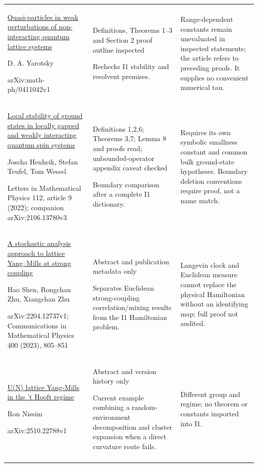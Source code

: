 \begin{longtable}{@{}p{46mm}p{60mm}p{46mm}@{}}
\href{https://arxiv.org/pdf/math-ph/0411042}{Quasi-particles in weak perturbations of non-interacting quantum lattice systems}\par D. A. Yarotsky\par arXiv:math-ph/0411042v1 & Definitions, Theorems 1--3 and Section 2 proof outline inspected\par Rechecks I1 stability and resolvent premises. & Range-dependent constants remain unevaluated in inspected statements; the article refers to preceding proofs. It supplies no convenient numerical tau.\\\addlinespace
\href{https://link.springer.com/article/10.1007/s11005-021-01494-y}{Local stability of ground states in locally gapped and weakly interacting quantum spin systems}\par Joscha Henheik, Stefan Teufel, Tom Wessel\par Letters in Mathematical Physics 112, article 9 (2022); companion arXiv:2106.13780v3 & Definitions 1,2,6; Theorems 3,7; Lemma 8 and proofs read; unbounded-operator appendix caveat checked\par Boundary comparison after a complete I1 dictionary. & Requires its own symbolic smallness constant and common bulk ground-state hypotheses. Boundary deletion conventions require proof, not a name match.\\\addlinespace
\href{https://arxiv.org/abs/2204.12737}{A stochastic analysis approach to lattice Yang--Mills at strong coupling}\par Hao Shen, Rongchan Zhu, Xiangchan Zhu\par arXiv:2204.12737v1; Communications in Mathematical Physics 400 (2023), 805--851 & Abstract and publication metadata only\par Separates Euclidean strong-coupling correlation/mixing results from the I1 Hamiltonian problem. & Langevin clock and Euclidean measure cannot replace the physical Hamiltonian without an identifying map; full proof not audited.\\\addlinespace
\href{https://arxiv.org/abs/2510.22788}{U(N) lattice Yang-Mills in the 't Hooft regime}\par Ron Nissim\par arXiv:2510.22788v1 & Abstract and version history only\par Current example combining a random-environment decomposition and cluster expansion when a direct curvature route fails. & Different group and regime; no theorem or constants imported into I1.\\\addlinespace

\end{longtable}
